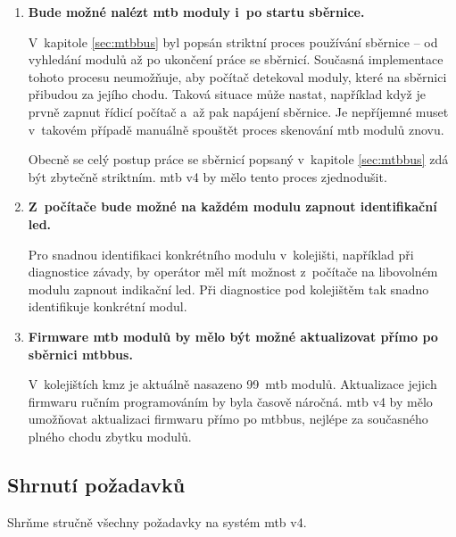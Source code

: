 \begin{enumerate}
\item \textbf{Bude možné nalézt \gls{mtb} moduly i~po startu sběrnice.}

	V~kapitole \ref{sec:mtbbus} byl popsán striktní proces používání
	sběrnice – od vyhledání modulů až po ukončení práce se sběrnicí. Současná
	implementace tohoto procesu neumožňuje, aby počítač detekoval moduly, které
	na sběrnici přibudou za jejího chodu. Taková situace může nastat, například
	když je prvně zapnut řídicí počítač a~až pak napájení sběrnice. Je
	nepříjemné muset v~takovém případě manuálně spouštět proces skenování
	\gls{mtb} modulů znovu.

	Obecně se celý postup práce se sběrnicí popsaný v~kapitole \ref{sec:mtbbus}
	zdá být zbytečně striktním. \gls{mtb} v4 by mělo tento proces zjednodušit.

\item \textbf{Z~počítače bude možné na každém modulu zapnout identifikační \gls{led}.}

	Pro snadnou identifikaci konkrétního modulu v~kolejišti, například při
	diagnostice závady, by operátor měl mít možnost z~počítače na libovolném
	modulu zapnout indikační \gls{led}. Při diagnostice pod kolejištěm tak snadno
	identifikuje konkrétní modul.

\item \textbf{Firmware \gls{mtb} modulů by mělo být možné aktualizovat přímo
	po sběrnici \gls{mtbbus}.}

	V~kolejištích \gls{kmz} je aktuálně nasazeno 99~\gls{mtb} modulů.
	Aktualizace jejich firmwaru ručním programováním by byla časově náročná.
	\gls{mtb} v4 by mělo umožňovat aktualizaci firmwaru přímo po
	\gls{mtbbus}, nejlépe za současného plného chodu zbytku modulů.

\end{enumerate}

\subsection{Shrnutí požadavků} \label{sub:mtbbus-req-summary}

Shrňme stručně všechny požadavky na systém \gls{mtb} v4.

